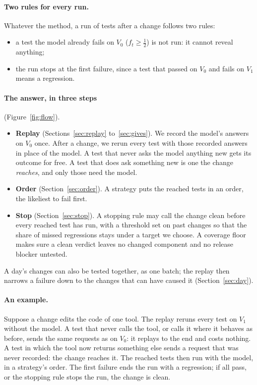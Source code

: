 \documentclass[11pt,a4paper]{article}
\begin{document}
\paragraph{Two rules for every run.} Whatever the method, a run of tests after a change follows two rules:
\begin{itemize}
  \item a test the model already fails on $V_0$ ($f_t \ge \frac12$) is not run: it cannot reveal anything;
  \item the run stops at the first failure, since a test that passed on $V_0$ and fails on $V_1$ means a
        regression.
\end{itemize}

\paragraph{The answer, in three steps} (Figure~\ref{fig:flow}).
\begin{itemize}
  \item \textbf{Replay} (Sections~\ref{sec:replay} to~\ref{sec:gives}). We record the model's answers on $V_0$
        once. After a change, we rerun every test with those recorded answers in place of the model. A test that
        never asks the model anything new gets its outcome for free. A test that does ask something new is one
        the change \emph{reaches}, and only those need the model.
  \item \textbf{Order} (Section~\ref{sec:order}). A strategy puts the reached tests in an order, the likeliest to
        fail first.
  \item \textbf{Stop} (Section~\ref{sec:stop}). A stopping rule may call the change clean before every reached
        test has run, with a threshold set on past changes so that the share of missed regressions stays under a
        target we choose. A coverage floor makes sure a clean verdict leaves no changed component and no release
        blocker untested.
\end{itemize}
A day's changes can also be tested together, as one batch; the replay then narrows a failure down to the changes
that can have caused it (Section~\ref{sec:day}).

\paragraph{An example.} Suppose a change edits the code of one tool. The replay reruns every test on $V_1$ without
the model. A test that never calls the tool, or calls it where it behaves as before, sends the same requests as on
$V_0$: it replays to the end and costs nothing. A test in which the tool now returns something else sends a
request that was never recorded: the change reaches it. The reached tests then run with the model, in a strategy's
order. The first failure ends the run with a regression; if all pass, or the stopping rule stops the run, the
change is clean.
\end{document}
